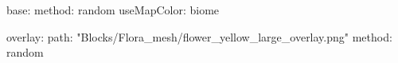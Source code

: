 base:
  method: random
  useMapColor: biome
  
overlay:
  path: "Blocks/Flora_mesh/flower_yellow_large_overlay.png"
  method: random